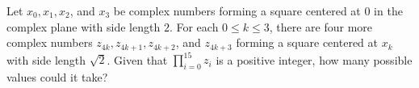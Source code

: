 Let $x_{0}, x_{1}, x_{2}$, and $x_{3}$ be complex numbers forming a square centered at $0$ in the complex plane with side length $2$. For each $0 \leq k \leq 3$, there are four more complex numbers $z_{4k}, z_{4k+1}, z_{4k+2}$, and $z_{4k+3}$ forming a square centered at $x_{k}$ with side length $\sqrt{2}$. Given that $\prod_{i=0}^{15} z_{i}$ is a positive integer, how many possible values could it take?